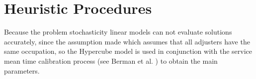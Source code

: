 \chapter{Heuristic Procedures}
\label{ch:Heuristic}
Because the problem stochasticity
linear models
can not evaluate solutions accurately,
since the assumption made
which assumes
that all adjusters have the same occupation,
so the Hypercube model is used
in conjunction with
the service mean time calibration process
(see Berman et al. \cite{berman1987stochastic})
to obtain the main parameters.



